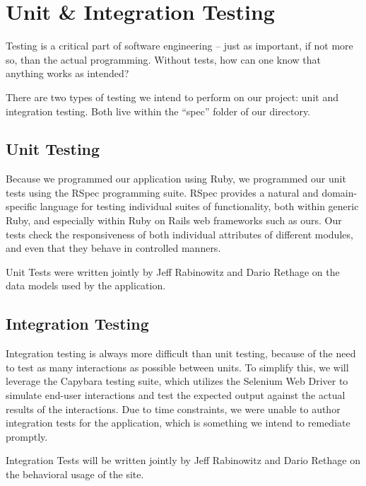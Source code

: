 \chapter{Unit \& Integration Testing}

Testing is a critical part of software engineering -- just as important,
if not more so, than the actual programming. Without tests, how can one
know that anything works as intended?

There are two types of testing we intend to perform on our project: unit
and integration testing. Both live within the ``spec'' folder of our
directory.

\section{Unit Testing}

Because we programmed our application using Ruby, we programmed
our unit tests using the RSpec programming suite. RSpec provides
a natural and domain-specific language for testing individual suites
of functionality, both within generic Ruby, and especially within
Ruby on Rails web frameworks such as ours. Our tests check the 
responsiveness of both individual attributes of different modules,
and even that they behave in controlled manners. 

Unit Tests were written jointly by Jeff Rabinowitz and Dario Rethage
on the data models used by the application.

\section{Integration Testing}

Integration testing is always more difficult than unit testing, because
of the need to test as many interactions as possible between units. 
To simplify this, we will leverage the Capybara testing suite, which
utilizes the Selenium Web Driver to simulate end-user interactions
and test the expected output against the actual results of the
interactions. Due to time constraints, we were unable to author
integration tests for the application, which is something we intend
to remediate promptly.

Integration Tests will be written jointly by Jeff Rabinowitz and 
Dario Rethage on the behavioral usage of the site.
